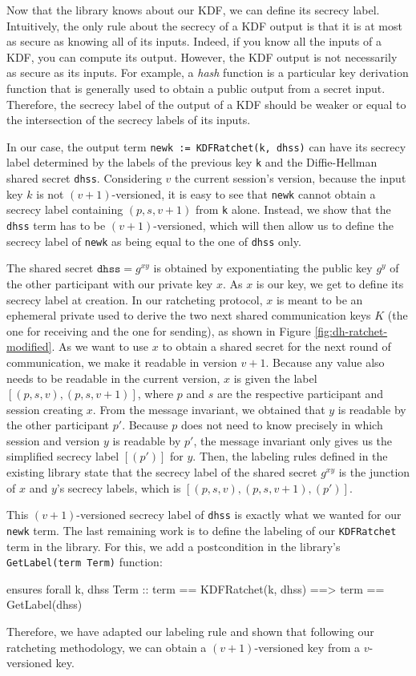 Now that the library knows about our KDF, we can define its secrecy label.
Intuitively, the only rule about the secrecy of a KDF output is that it is at most as secure as knowing all of its inputs. Indeed, if you know all the inputs of a KDF, you can compute its output.
However, the KDF output is not necessarily as secure as its inputs. For example, a \emph{hash} function is a particular key derivation function that is generally used to obtain a public output from a secret input. 
Therefore, the secrecy label of the output of a KDF should be weaker or equal to the intersection of the secrecy labels of its inputs.

In our case, the output term \texttt{newk := KDFRatchet(k, dhss)} can have its secrecy label determined by the labels of the previous key \texttt{k} and the Diffie-Hellman shared secret \texttt{dhss}.
Considering $v$ the current session's version, because the input key $k$ is not $(v+1)$-versioned, it is easy to see that \texttt{newk} cannot obtain a secrecy label containing $(p,s,v+1)$ from \texttt{k} alone.
Instead, we show that the \texttt{dhss} term has to be $(v+1)$-versioned, which will then allow us to define the secrecy label of \texttt{newk} as being equal to the one of \texttt{dhss} only.

The shared secret $\texttt{dhss} = g^{xy}$ is obtained by exponentiating the public key $g^y$ of the other participant with our private key $x$.
As $x$ is our key, we get to define its secrecy label at creation. 
In our ratcheting protocol, $x$ is meant to be an ephemeral private used to derive the two next shared communication keys $K$ (the one for receiving and the one for sending), as shown in Figure \ref{fig:dh-ratchet-modified}.
As we want to use $x$ to obtain a shared secret for the next round of communication, we make it readable in version $v+1$. Because any value also needs to be readable in the current version, $x$ is given the label $[(p,s,v),(p,s,v+1)]$, where $p$ and $s$ are the respective participant and session creating $x$.
From the message invariant, we obtained that $y$ is readable by the other participant $p'$. Because $p$ does not need to know precisely in which session and version $y$ is readable by $p'$, the message invariant only gives us the simplified secrecy label $[(p')]$ for $y$.
Then, the labeling rules defined in the existing library state that the secrecy label of the shared secret $g^{xy}$ is the junction of $x$ and $y$'s secrecy labels, which is $[(p,s,v),(p,s,v+1),(p')]$.

This $(v+1)$-versioned secrecy label of \texttt{dhss} is exactly what we wanted for our \texttt{newk} term.
The last remaining work is to define the labeling of our \texttt{KDFRatchet} term in the library. 
For this, we add a postcondition in the library's \texttt{GetLabel(term Term)} function:
\begin{gobra}
ensures forall k, dhss Term ::
    term == KDFRatchet(k, dhss) ==> term == GetLabel(dhss)
\end{gobra}
Therefore, we have adapted our labeling rule and shown that following our ratcheting methodology, we can obtain a $(v+1)$-versioned key from a $v$-versioned key.

